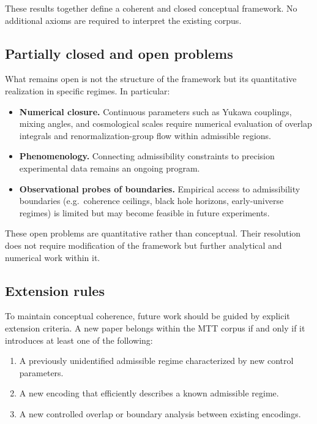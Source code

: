 \documentclass[11pt]{article}
\begin{document}
These results together define a coherent and closed conceptual framework. No additional axioms are required to interpret the existing corpus.

\subsection{Partially closed and open problems}

What remains open is not the structure of the framework but its quantitative realization in specific regimes. In particular:

\begin{itemize}
\item \textbf{Numerical closure.}  
  Continuous parameters such as Yukawa couplings, mixing angles, and cosmological scales require numerical evaluation of overlap integrals and renormalization-group flow within admissible regions.
\item \textbf{Phenomenology.}  
  Connecting admissibility constraints to precision experimental data remains an ongoing program.
\item \textbf{Observational probes of boundaries.}  
  Empirical access to admissibility boundaries (e.g.\ coherence ceilings, black hole horizons, early-universe regimes) is limited but may become feasible in future experiments.
\end{itemize}

These open problems are quantitative rather than conceptual. Their resolution does not require modification of the framework but further analytical and numerical work within it.

\subsection{Extension rules}

To maintain conceptual coherence, future work should be guided by explicit extension criteria. A new paper belongs within the MTT corpus if and only if it introduces at least one of the following:

\begin{enumerate}
\item A previously unidentified admissible regime characterized by new control parameters.
\item A new encoding that efficiently describes a known admissible regime.
\item A new controlled overlap or boundary analysis between existing encodings.
\end{enumerate}
\end{document}
